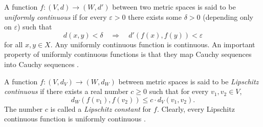 \begin{definition}\label{def:uni_cont}
  A function \( f : (V, d) \to (W, d') \) between two metric spaces is said to be \emph{uniformly continuous} if for every \( \varepsilon > 0 \) there exists some \( \delta > 0 \) (depending only on \( \varepsilon \)) such that  
\[
d(x, y) < \delta \quad \Rightarrow \quad d'(f(x), f(y)) < \varepsilon
\]
for all \( x, y \in X \).  
Any uniformly continuous function is continuous.  
An important property of uniformly continuous functions is that they map Cauchy sequences into Cauchy sequences \cite{guide2006infinite}. 
\end{definition}


\begin{definition} \label{def:lip_uni_cont}
  A function \( f : (V, d_V) \to (W, d_W) \) between metric spaces is said to be \emph{Lipschitz continuous} if there exists a real number \( c \geq 0 \) such that for every \( v_1, v_2 \in V \),
\[
d_W(f(v_1), f(v_2)) \leq c \cdot d_V(v_1, v_2).
\]
The number \( c \) is called a \emph{Lipschitz constant} for \( f \).  
Clearly, every Lipschitz continuous function is uniformly continuous  \cite{guide2006infinite}.
\end{definition}

